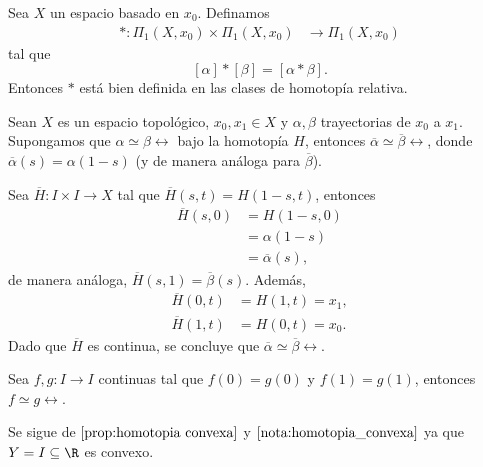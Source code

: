     \begin{coro}
        Sea $X$ un espacio basado en $x_0$. Definamos 
        \begin{align*}
            *:\Pi_1(X,x_0)\times \Pi_1(X,x_0)&\to \Pi_1(X,x_0)
        \end{align*}
    tal que 
    $$[\alpha]*[\beta]=[\alpha*\beta].$$
    Entonces $*$ está bien definida en las clases de homotopía relativa.
    \end{coro}
    \begin{lema}
        Sean $X$ es un espacio topológico, $x_0,x_1\in X$ y $\alpha,\beta$ trayectorias de $x_0$ a $x_1$. Supongamos que $\alpha\simeq\beta\rel$ bajo la homotopía $H$, entonces $\overline{\alpha}\simeq \overline{\beta}\rel$, donde $\overline{\alpha}(s)=\alpha(1-s)$ (y de manera análoga para $\overline{\beta}$).
    \end{lema}
    \begin{dem}
        Sea $\overline{H}:I\times I\to X$ tal que $\overline{H}(s,t)=H(1-s,t)$, entonces
        \begin{align*}
            \overline{H}(s,0)&=H(1-s,0)\\
            &=\alpha(1-s)\\
            &=\overline{\alpha}(s),
        \end{align*}
        de manera análoga, $\overline{H}(s,1)=\overline{\beta}(s)$. Además,
         \begin{align*}
            \overline{H}(0,t)&=H(1,t)=x_1,\\
            \overline{H}(1,t)&=H(0,t)=x_0.
        \end{align*}
        Dado que $\overline{H}$ es continua, se concluye que $\overline{\alpha}\simeq \overline{\beta}\rel$.
    \end{dem}
    \begin{lema}
    \label{lema:lema 2}
        Sea $f,g:I\to I$ continuas tal que $f(0)=g(0)$ y $f(1)=g(1)$, entonces $f\simeq g \rel$.
    \end{lema}
    \begin{dem}
        Se sigue de $\ref{prop:homotopia convexa}$ y $\ref{nota:homotopia_convexa}$ ya que $Y=I\subseteq \R$ es convexo.
    \end{dem}
    
